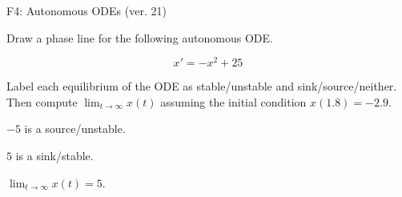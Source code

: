 \begin{exercise}
  \begin{exerciseTitle}F4: Autonomous ODEs (ver. 21)\end{exerciseTitle}
  \begin{exerciseStatement}
    

      Draw a phase line for the following 
      autonomous ODE.
    

    
\[x'= -x^{2} + 25\]

    

      Label each equilibrium of the ODE
      as stable/unstable and sink/source/neither.
      Then compute \(\lim_{t\to\infty}x(t)\)
      assuming the initial condition
      \(x( 1.8 )= -2.9\).
    

  \end{exerciseStatement}
  \begin{exerciseAnswer}
    

      \(-5\) is a source/unstable.
      
      \(5\) is a sink/stable.
    

    

      \(\lim_{t\to\infty}x(t)=5\).
    

  \end{exerciseAnswer}
\end{exercise}